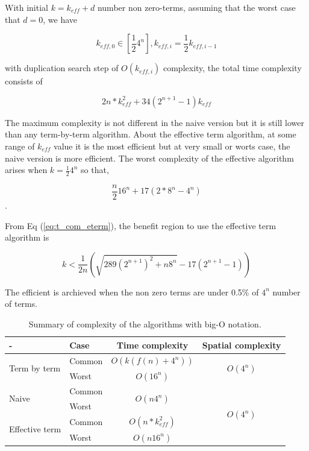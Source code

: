 \documentclass[twocolumn]{article}
\begin{document}
With initial $k = k_{eff} +d$ number non zero-terms,
assuming that the worst case that $d=0$, we have 

\begin{equation}
    k_{eff, 0} \in [\frac{1}{2}4^{n}], k_{eff, i} = \frac{1}{2} k_{eff, i-1}
\end{equation}

with duplication search step of $O(k_{eff, i})$ complexity,
the total time complexity consists of 

\begin{equation}
    \label{eq:t_com_eterm}
    2 n * k_{eff}^2 + 34 (2^{n+1} -1) k_{eff}
\end{equation} 

The maximum complexity is not different in the naive version but it is still
lower than any term-by-term algorithm. About the effective term algorithm,
at some range of $k_{eff}$ value it is the most efficient but 
at very small or worts case, the naive version is more efficient. 
The worst complexity of the effective algorithm arises 
when $k=\frac{1}{2}4^n$ so that,

\begin{equation}
    \frac{n}{2} 16^n + 17 (2 * 8^n - 4^n) 
\end{equation}.

From Eq (\ref{eq:t_com_eterm}), the benefit region to use 
the effective term algorithm is 

\begin{equation}
    k < \frac{1}{2n} \left(\sqrt{289(2^{n+1})^2 + n 8^n} - 17 (2^{n+1} -1) \right) 
\end{equation}

The efficient is archieved when the non zero terms are under 0.5\% of $4^n$ number of terms.

\begin{table}
    \centering
    \caption{Summary of complexity of the algorithms with big-O notation.}
    \label{table:complexity}
    \begin{tabular}{l|l|cc}
        -                                & Case      & Time complexity                   & Spatial complexity\\
        \hline
        \multirow{2}{8em}{Term by term}  & Common    & $O(k(f(n) +4^n))$                 & \multirow{2}{2em}{$O(4^n)$}\\
                                         & Worst     & $O(16^n)$                         &\\
        \multirow{2}{8em}{Naive}         & Common    &\multirow{2}{1em}{$O(n4^n)$}        & \multirow{4}{2em}{$O(4^n)$}\\
                                         & Worst     &                                   &\\
        \multirow{2}{8em}{Effective term}& Common    &$O(n * k_{eff}^2)$                 & \\
                                         & Worst     &$O(n16^n)$                         & \\
        \hline                                      
    \end{tabular}
\end{table}
\end{document}
